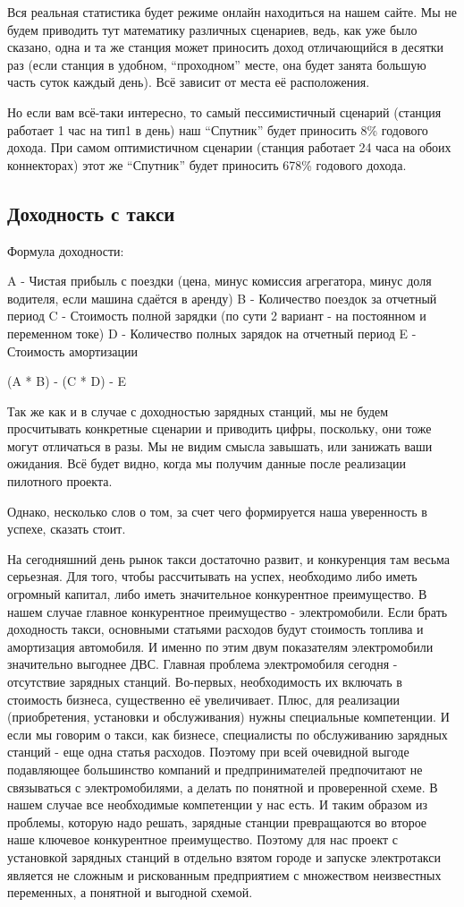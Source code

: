 \documentclass[a4paper,12pt]{report}
\begin{document}
Вся реальная статистика будет режиме онлайн находиться на нашем сайте. Мы не будем приводить тут математику различных сценариев, ведь, как уже было сказано, одна и та же станция может приносить доход отличающийся в десятки раз (если станция в удобном, “проходном” месте, она будет занята большую часть суток каждый день). Всё зависит от места её расположения.

Но если вам всё-таки интересно, то самый пессимистичный сценарий (станция работает 1 час на тип1 в день) наш “Спутник” будет приносить 8\% годового дохода. При самом оптимистичном сценарии (станция работает 24 часа на обоих коннекторах) этот же “Спутник” будет приносить 678\% годового дохода.


\subsection{Доходность с такси}

Формула доходности:

A - Чистая прибыль с поездки (цена, минус комиссия агрегатора, минус доля водителя, если машина сдаётся в аренду)
B - Количество поездок за отчетный период
C - Стоимость полной зарядки (по сути 2 вариант - на постоянном и переменном токе)
D - Количество полных зарядок на отчетный период
E - Стоимость амортизации


(A * B) - (C * D) - E

Так же как и в случае с доходностью зарядных станций, мы не будем просчитывать конкретные сценарии и приводить цифры, поскольку, они тоже могут отличаться в разы. 
Мы не видим смысла завышать, или занижать ваши ожидания. Всё будет видно, когда мы получим данные после реализации пилотного проекта.

Однако, несколько слов о том, за счет чего формируется наша уверенность в успехе, сказать стоит. 

На сегодняшний день рынок такси достаточно развит, и конкуренция там весьма серьезная. Для того, чтобы рассчитывать на успех, необходимо либо иметь огромный капитал, либо иметь значительное конкурентное преимущество. В нашем случае главное конкурентное преимущество - электромобили.
Если брать доходность такси, основными статьями расходов будут стоимость топлива и амортизация автомобиля. И именно по этим двум показателям электромобили значительно выгоднее ДВС.
Главная проблема электромобиля сегодня - отсутствие зарядных станций. Во-первых, необходимость их включать в стоимость бизнеса, существенно её увеличивает. Плюс, для реализации (приобретения, установки и обслуживания) нужны специальные компетенции. И если мы говорим о такси, как бизнесе, специалисты по обслуживанию зарядных станций - еще одна статья расходов.
Поэтому при всей очевидной выгоде подавляющее большинство компаний и предпринимателей предпочитают не связываться с электромобилями, а делать по понятной и проверенной схеме. 
В нашем случае все необходимые компетенции у нас есть. И таким образом из проблемы, которую надо решать, зарядные станции превращаются во второе наше ключевое конкурентное преимущество. 
Поэтому для нас проект с установкой зарядных станций в отдельно взятом городе и запуске электротакси является не сложным и рискованным предприятием с множеством неизвестных переменных, а понятной и выгодной схемой.
\end{document}

